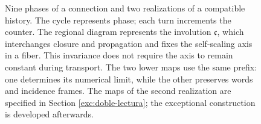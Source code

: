 \begin{figure}[H]
\caption{\fontsize{9}{11}\selectfont Nine phases of a connection and two realizations of a compatible
history. The cycle represents phase; each turn increments the counter.
The regional diagram represents the involution \(\mathfrak c\), which
interchanges closure and propagation and fixes the self-scaling axis in a fiber.
This invariance does not require the axis to remain constant during transport.
The two lower maps use the same prefix: one determines its numerical limit,
while the other preserves words and incidence frames. The maps of the second
realization are specified in Section \ref{exc:doble-lectura}; the exceptional
construction is developed afterwards.}
\label{mono-ampl:fig-regional}
\end{figure}

